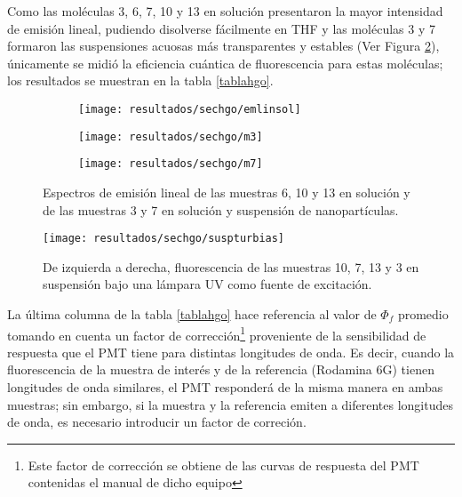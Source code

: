Como las mol\'eculas 3, 6, 7, 10 y 13 en soluci\'on presentaron la mayor intensidad de emisi\'on lineal, pudiendo disolverse f\'acilmente en THF y las mol\'eculas 3 y 7 formaron las suspensiones acuosas m\'as transparentes y estables (Ver Figura \ref{susphgo}), \'unicamente se midi\'o la eficiencia cu\'antica de fluorescencia para estas mol\'eculas; los resultados se muestran en la tabla \ref{tablahgo}.




\begin{figure}[H]
\centering
\begin{subfigure}{\textwidth}
\centering
\texttt{[image: resultados/sechgo/emlinsol]}
\end{subfigure}
\begin{subfigure}{\textwidth}
\centering
\texttt{[image: resultados/sechgo/m3]}
\end{subfigure}
\begin{subfigure}{\textwidth}
\centering
\texttt{[image: resultados/sechgo/m7]}
\end{subfigure}
\caption{Espectros de emisi\'on lineal de las muestras 6, 10 y 13 en soluci\'on y de las muestras 3 y 7 en soluci\'on y suspensi\'on de nanopart\'iculas.}
\label{emilinhgo}
\end{figure}

\begin{figure}[h]
\centering
\texttt{[image: resultados/sechgo/suspturbias]}
\caption{De izquierda a derecha, fluorescencia de las muestras 10, 7, 13 y 3 en suspensi\'on bajo una l\'ampara UV como fuente de excitaci\'on.}\label{susphgo}
\end{figure}


La \'ultima columna de la tabla \ref{tablahgo} hace referencia al valor de $\Phi_f$ promedio tomando en cuenta un factor de correcci\'on\footnote{Este factor de correcci\'on se obtiene de las curvas de respuesta del PMT contenidas el manual de dicho equipo} proveniente de la sensibilidad de respuesta que el PMT tiene para distintas longitudes de onda. Es decir,  cuando la fluorescencia de la muestra de inter\'es y de la referencia (Rodamina 6G) tienen longitudes de onda similares, el PMT responder\'a de la misma manera en ambas muestras; sin embargo, si la muestra y la referencia emiten a diferentes longitudes de onda, es necesario introducir un factor de correci\'on.




